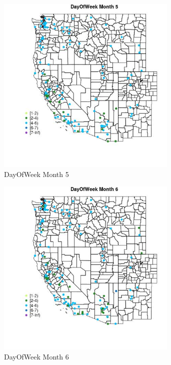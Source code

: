 \begin{figure} 
\centering  
\includegraphics[width=0.77\textwidth]{Code_Outputs/Report_ML_input_PM25_Step4_part_e_de_duplicated_aves_MapObsMo5DayOfWeek.jpg} 
\caption{\label{fig:Report_ML_input_PM25_Step4_part_e_de_duplicated_avesMapObsMo5DayOfWeek}DayOfWeek Month 5} 
\end{figure} 
 

\begin{figure} 
\centering  
\includegraphics[width=0.77\textwidth]{Code_Outputs/Report_ML_input_PM25_Step4_part_e_de_duplicated_aves_MapObsMo6DayOfWeek.jpg} 
\caption{\label{fig:Report_ML_input_PM25_Step4_part_e_de_duplicated_avesMapObsMo6DayOfWeek}DayOfWeek Month 6} 
\end{figure} 
 

